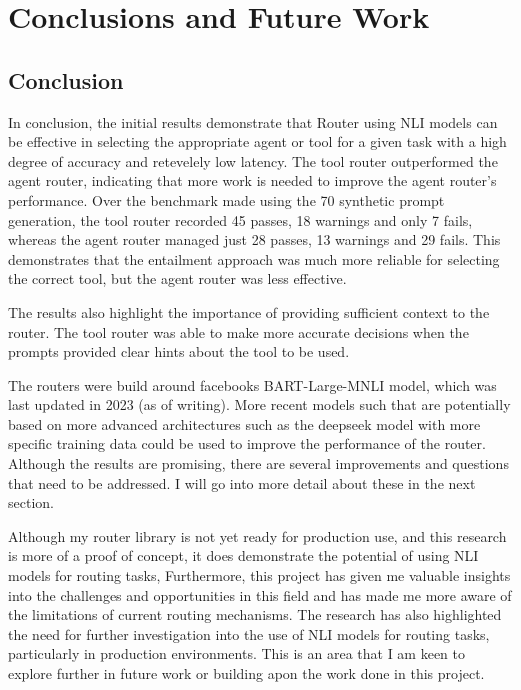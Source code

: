 \chapter{Conclusions and Future Work}
\label{ch:con}


\section{Conclusion}
\label{sec:results-conclusion}
In conclusion, the initial results demonstrate that Router using NLI models can be effective in selecting the appropriate agent or tool for a given task with a high degree of accuracy and retevelely low latency. The tool router outperformed the agent router, indicating that more work is needed to improve the agent router's performance.  Over the benchmark made using the 70 synthetic prompt generation, the tool router recorded 45 passes, 18 warnings and only 7 fails, whereas the agent router managed just 28 passes, 13 warnings and 29 fails. This demonstrates that the entailment approach was much more reliable for selecting the correct tool, but the agent router was less effective. 

The results also highlight the importance of providing sufficient context to the router. The tool router was able to make more accurate decisions when the prompts provided clear hints about the tool to be used.

The routers were build around facebooks BART-Large-MNLI model, which was last updated in 2023 (as of writing). More recent models such that are potentially based on more advanced architectures such as the deepseek model with more specific training data could be used to improve the performance of the router. Although the results are promising, there are several improvements and questions that need to be addressed. I will go into more detail about these in the next section.

Although my router library is not yet ready for production use, and this research is more of a proof of concept, it does demonstrate the potential of using NLI models for routing tasks, Furthermore, this project has given me valuable insights into the challenges and opportunities in this field and has made me more aware of the limitations of current routing mechanisms. The research has also highlighted the need for further investigation into the use of NLI models for routing tasks, particularly in production environments. This is an area that I am keen to explore further in future work or building apon the work done in this project.


